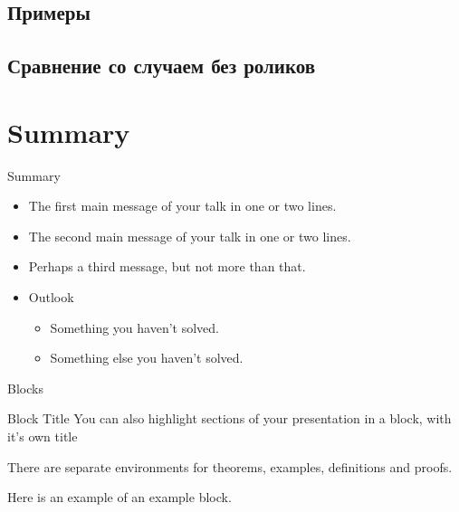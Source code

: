 \documentclass{beamer}
\begin{document}
\subsection{Примеры}

\subsection{Сравнение со случаем без роликов}


\section*{Summary}

\begin{frame}{Summary}
  \begin{itemize}
  \item
    The \alert{first main message} of your talk in one or two lines.
  \item
    The \alert{second main message} of your talk in one or two lines.
  \item
    Perhaps a \alert{third message}, but not more than that.
  \end{itemize}
  
  \begin{itemize}
  \item
    Outlook
    \begin{itemize}
    \item
      Something you haven't solved.
    \item
      Something else you haven't solved.
    \end{itemize}
  \end{itemize}
\end{frame}

\begin{frame}{Blocks}
\begin{block}{Block Title}
You can also highlight sections of your presentation in a block, with it's own title
\end{block}
\begin{theorem}
There are separate environments for theorems, examples, definitions and proofs.
\end{theorem}
\begin{example}
Here is an example of an example block.
\end{example}
\end{frame}
\end{document}

